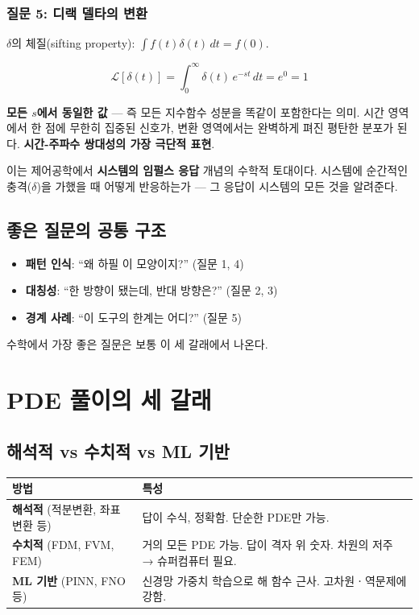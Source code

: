 \documentclass[11pt,a4paper]{article}
\begin{document}
\subsubsection{질문 5: 디랙 델타의 변환}

$\delta$의 체질(sifting property): $\int f(t)\delta(t)\,dt = f(0)$.

\begin{equation}
\mathcal{L}[\delta(t)] = \int_0^\infty \delta(t)\, e^{-st}\, dt = e^{0} = 1
\end{equation}

\textbf{모든 $s$에서 동일한 값} --- 즉 모든 지수함수 성분을 똑같이 포함한다는 의미. 시간 영역에서 한 점에 무한히 집중된 신호가, 변환 영역에서는 완벽하게 펴진 평탄한 분포가 된다. \textbf{시간-주파수 쌍대성의 가장 극단적 표현}.

이는 제어공학에서 \textbf{시스템의 임펄스 응답} 개념의 수학적 토대이다. 시스템에 순간적인 충격($\delta$)을 가했을 때 어떻게 반응하는가 --- 그 응답이 시스템의 모든 것을 알려준다.

\subsection{좋은 질문의 공통 구조}

\begin{itemize}
\item \textbf{패턴 인식}: ``왜 하필 이 모양이지?'' (질문 1, 4)
\item \textbf{대칭성}: ``한 방향이 됐는데, 반대 방향은?'' (질문 2, 3)
\item \textbf{경계 사례}: ``이 도구의 한계는 어디?'' (질문 5)
\end{itemize}

수학에서 가장 좋은 질문은 보통 이 세 갈래에서 나온다.

\section{PDE 풀이의 세 갈래}

\subsection{해석적 vs 수치적 vs ML 기반}

\begin{center}
\begin{tabular}{p{4cm}p{10cm}}
\toprule
방법 & 특성 \\
\midrule
\textbf{해석적} (적분변환, 좌표변환 등) & 답이 수식, 정확함. 단순한 PDE만 가능. \\
\textbf{수치적} (FDM, FVM, FEM) & 거의 모든 PDE 가능. 답이 격자 위 숫자. 차원의 저주 → 슈퍼컴퓨터 필요. \\
\textbf{ML 기반} (PINN, FNO 등) & 신경망 가중치 학습으로 해 함수 근사. 고차원ㆍ역문제에 강함. \\
\bottomrule
\end{tabular}
\end{center}
\end{document}
